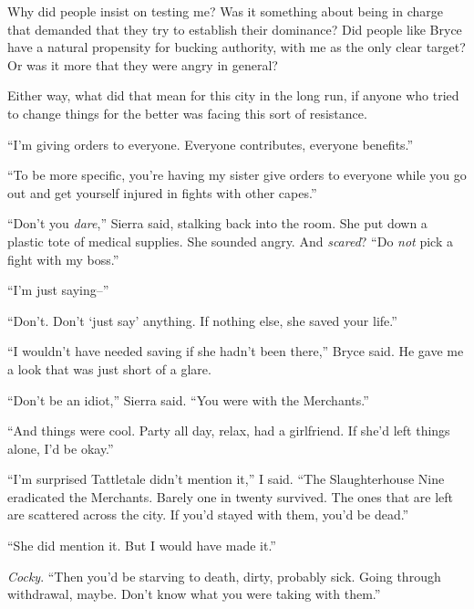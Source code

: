 Why did people insist on testing me?  Was it something about being in charge that demanded that they try to establish their dominance?  Did people like Bryce have a natural propensity for bucking authority, with me as the only clear target?  Or was it more that they were angry in general?



Either way, what did that mean for this city in the long run, if anyone who tried to change things for the better was facing this sort of resistance.



``I'm giving orders to everyone.  Everyone contributes, everyone benefits.''



``To be more specific, you're having my sister give orders to everyone while you go out and get yourself injured in fights with other capes.''



``Don't you \emph{dare},'' Sierra said, stalking back into the room.  She put down a plastic tote of medical supplies.  She sounded angry.  And \emph{scared}?  ``Do \emph{not} pick a fight with my boss.''



``I'm just saying--''



``Don't.  Don't `just say' anything.  If nothing else, she saved your life.''



``I wouldn't have needed saving if she hadn't been there,'' Bryce said.  He gave me a look that was just short of a glare.



``Don't be an idiot,'' Sierra said.  ``You were with the Merchants.''



``And things were cool.  Party all day, relax, had a girlfriend.  If she'd left things alone, I'd be okay.''



``I'm surprised Tattletale didn't mention it,'' I said.  ``The Slaughterhouse Nine eradicated the Merchants.  Barely one in twenty survived.  The ones that are left are scattered across the city.  If you'd stayed with them, you'd be dead.''



``She did mention it.  But I would have made it.''



\emph{Cocky}.  ``Then you'd be starving to death, dirty, probably sick.  Going through withdrawal, maybe.  Don't know what you were taking with them.''



